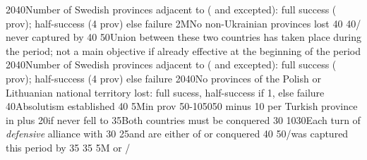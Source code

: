 {20}{40}{Number of Swedish provinces adjacent to \regionBaltique (\regionSuede
  and \regionFinlande excepted): full success ( prov);
  half-success (4 prov) else failure}%
%
\EUobjective2M{No non-Ukrainian provinces lost}{}%
{}{40}{}%
%
%
{}{40}{\provinceOsterreich/ never captured by
  }%
%
%
{}{40}{}%
%
%
%
{}{50}{Union between these two countries has taken place during the period;
  not a main objective if already effective at the beginning of the period}%
%
%
%
{20}{40}{Number of Swedish provinces adjacent to \regionBaltique (\regionSuede
  and \regionFinlande excepted): full success ( prov);
  half-success (4 prov) else failure}%
%
%
{20}{40}{No provinces of the Polish or Lithuanian national territory lost:
  full sucess, half-success if 1, else failure}%
%
%
{}{40}{Absolutism established}%
%
%
{}{40}{}%
%
\EUobjective5M{\TUR in \payshongrie}{prov}%
{50-10}{50}{50 \VPs minus 10 \VPs per Turkish province in \payshongrie plus
  20\VPs if \villeVienne never fell to \TUR}%
%
 
%
%
{}{35}{Both countries must be conquered}%
%
%
{}{30}{}%
%
%
{10}{30}{Each turn of \emph{defensive} alliance with \paysmajeurFrance}%
%
%
{}{30}{}%
%
%
{}{25}{\paysvalachie and \paysmoldavie are either \VASSAL of \TUR or
  conquered}%
%
%
%
{}{40}{}%
%
%
{}{50}{\provinceOsterreich/\villeVienne was captured this period by \TUR}%
%
%
{}{35}{}%
%
%
{}{35}{}%
%
\EUobjective5M{ or }{\COL/\TP}%
